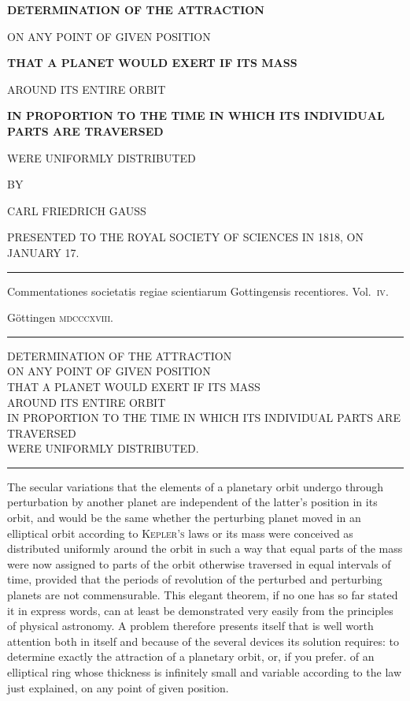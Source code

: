 \begingroup
\renewcommand{\arraystretch}{1.45}
\clearpage{}\thispagestyle{empty}
\vspace*{1.5em}
\begin{center}
\textbf{DETERMINATION OF THE ATTRACTION}

ON ANY POINT OF GIVEN POSITION

\textbf{THAT A PLANET WOULD EXERT IF ITS MASS}

AROUND ITS ENTIRE ORBIT

\textbf{IN PROPORTION TO THE TIME IN WHICH ITS INDIVIDUAL PARTS ARE TRAVERSED}

WERE UNIFORMLY DISTRIBUTED

\bigskip
BY

\bigskip
CARL FRIEDRICH GAUSS

\bigskip
PRESENTED TO THE ROYAL SOCIETY OF SCIENCES IN 1818, ON JANUARY 17.

\bigskip
\rule{0.7\linewidth}{0.4pt}

Commentationes societatis regiae scientiarum Gottingensis recentiores. Vol.~\textsc{iv}.

Göttingen \textsc{mdcccxviii}.

\rule{0.7\linewidth}{0.4pt}
\end{center}
\clearpage{}
{\small\begin{center}
DETERMINATION OF THE ATTRACTION\\
ON ANY POINT OF GIVEN POSITION\\
THAT A PLANET WOULD EXERT IF ITS MASS\\
AROUND ITS ENTIRE ORBIT\\
IN PROPORTION TO THE TIME IN WHICH ITS INDIVIDUAL PARTS ARE TRAVERSED\\
WERE UNIFORMLY DISTRIBUTED.
\end{center}}

\begin{center}\rule{2cm}{0.3pt}\end{center}
The secular variations that the elements of a planetary orbit undergo through perturbation by another planet are independent of the latter’s position in its orbit, and would be the same whether the perturbing planet moved in an elliptical orbit according to \textsc{Kepler’s} laws or its mass were conceived as distributed uniformly around the orbit in such a way that equal parts of the mass were now assigned to parts of the orbit otherwise traversed in equal intervals of time, provided that the periods of revolution of the perturbed and perturbing planets are not commensurable. This elegant theorem, if no one has so far stated it in express words, can at least be demonstrated very easily from the principles of physical astronomy. A problem therefore presents itself that is well worth attention both in itself and because of the several devices its solution requires: to determine exactly the attraction of a planetary orbit, or, if you prefer. of an elliptical ring whose thickness is infinitely small and variable according to the law just explained, on any point of given position.

